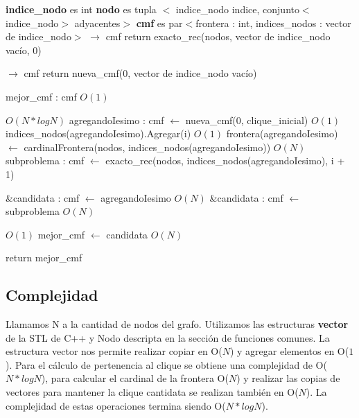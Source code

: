 \documentclass[a4paper, 10pt, twoside]{article}
\newenvironment{pseudo}[1][]{%
    \vspace{1em}%
    \begin{algorithmic}%
}
{%
    \end{algorithmic}%
    \vspace{1em}%
}
\newcommand{\Ode}[1]{\hfill $O(#1)$}
\begin{document}
\begin{pseudo}
\State \textbf{indice\_nodo} es int
\State \textbf{nodo} es tupla $<$ indice\_nodo indice, conjunto$<$indice\_nodo$>$ adyacentes$>$
\State \textbf{cmf} es par$<$frontera : int, indices\_nodos : vector de indice\_nodo$>$
\State
{} $\rightarrow$ cmf
	\State return exacto\_rec(nodos, vector de indice\_nodo vacío, 0)
\State
\EndProcedure

 $\rightarrow$ cmf
	 return nueva\_cmf(0, vector de indice\_nodo vacío) \EndIf

	\State mejor\_cmf : cmf									\Ode{1}

		 \Ode{N * log N}
			\State agregandoIesimo : cmf $\leftarrow$ nueva\_cmf(0, clique\_inicial)	\Ode{1}
			\State indices\_nodos(agregandoIesimo).Agregar(i)	\Ode{1}
			\State frontera(agregandoIesimo) $\leftarrow$
					cardinalFrontera(nodos, indices\_nodos(agregandoIesimo))	\Ode{N}
			\State subproblema : cmf $\leftarrow$
					exacto\_rec(nodos, indices\_nodos(agregandoIesimo), i + 1)

				\State \&candidata : cmf $\leftarrow$ agregandoIesimo			\Ode{N}
			\Else 
				\State \&candidata : cmf $\leftarrow$ subproblema				\Ode{N}
			\EndIf

			 \Ode{1}
				\State mejor\_cmf $\leftarrow$ candidata	\Ode{N}
			\EndIf
		\EndIf
	\EndFor

	\State return mejor\_cmf
\EndProcedure
\end{pseudo}

\subsection{Complejidad}
Llamamos N a la cantidad de nodos del grafo. Utilizamos las estructuras \textbf{vector} de la STL de C++ y Nodo descripta en la sección de funciones comunes. La estructura vector nos permite realizar copiar en O($N$) y agregar elementos en O($1$).
Para el cálculo de pertenencia al clique se obtiene una complejidad de O($N * log N$), para calcular el cardinal de la frontera O($N$) y realizar las copias de vectores para mantener la clique cantidata se realizan también en O($N$). La complejidad de estas operaciones termina siendo O($N * log N$).
\end{document}

